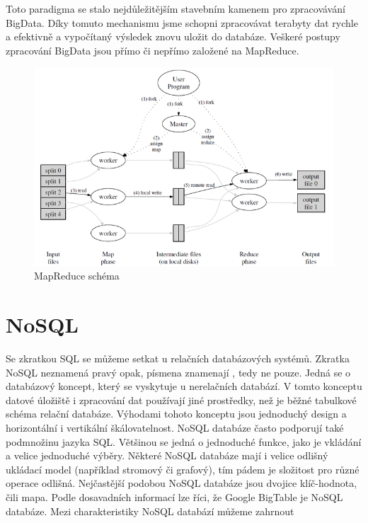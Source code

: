 Toto paradigma se stalo nejdůležitějším stavebním kamenem pro zpracovávání BigData. Díky tomuto mechanismu jsme schopni zpracovávat terabyty dat rychle a efektivně a vypočítaný výsledek znovu uložit do databáze. Veškeré postupy zpracování BigData jsou přímo či nepřímo založené na MapReduce. 

\begin{figure}[!h]
\includegraphics[scale=0.6]{images/mapreduce}
\caption{MapReduce schéma \cite{mapreduce}}
\label{fig:mapreduce}
\end{figure}

\newpage

\section{NoSQL}
Se zkratkou SQL se můžeme setkat u relačních databázových systémů. Zkratka NoSQL neznamená pravý opak, písmena  znamenají , tedy ne pouze. Jedná se o databázový koncept, který se vyskytuje u nerelačních databází. V tomto konceptu datové úložiště i zpracování dat používají jiné prostředky, než je běžné tabulkové schéma relační databáze. Výhodami tohoto konceptu jsou jednoduchý design a horizontální i vertikální škálovatelnost. NoSQL databáze často podporují také podmnožinu jazyka SQL. Většinou se jedná o jednoduché funkce, jako je vkládání a velice jednoduché výběry. Některé NoSQL databáze mají i velice odlišný ukládací model (například stromový či grafový), tím pádem je složitost pro různé operace odlišná. Nejčastější podobou NoSQL databáze jsou dvojice klíč-hodnota, čili mapa. Podle dosavadních informací lze říci, že Google BigTable je NoSQL databáze. Mezi charakteristiky NoSQL databází můžeme zahrnout


